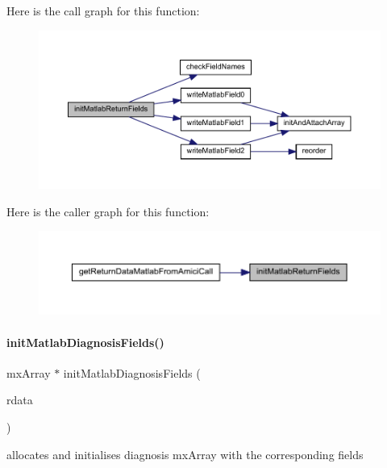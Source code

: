 Here is the call graph for this function\+:
\nopagebreak
\begin{figure}[H]
\begin{center}
\leavevmode
\includegraphics[width=350pt]{namespaceamici_a7449834fca1e0bde53d5f73ae0d2b929_cgraph}
\end{center}
\end{figure}
Here is the caller graph for this function\+:
\nopagebreak
\begin{figure}[H]
\begin{center}
\leavevmode
\includegraphics[width=350pt]{namespaceamici_a7449834fca1e0bde53d5f73ae0d2b929_icgraph}
\end{center}
\end{figure}
\mbox{\label{namespaceamici_aa12d4917fed647a1edeaaa26a261c770}} 
\paragraph{\texorpdfstring{initMatlabDiagnosisFields()}{initMatlabDiagnosisFields()}}
{\footnotesize\ttfamily mx\+Array $\ast$ init\+Matlab\+Diagnosis\+Fields (\begin{DoxyParamCaption}\item[{\mbox{\hyperlink{classamici_1_1_return_data}{Return\+Data}} const $\ast$}]{rdata }\end{DoxyParamCaption})}

allocates and initialises diagnosis mx\+Array with the corresponding fields


